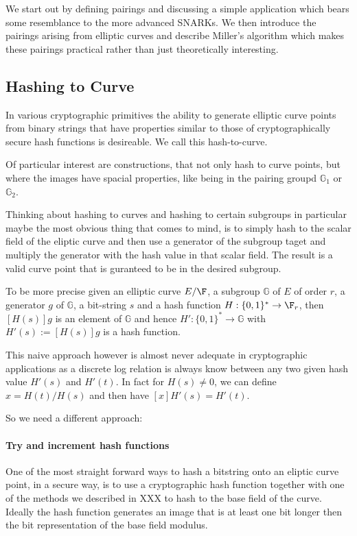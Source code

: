 We start out by defining pairings and discussing a simple application which bears some resemblance to the more advanced SNARKs. We then introduce the pairings arising from elliptic curves and describe Miller's algorithm which makes these pairings practical rather than just theoretically interesting.

\subsection{Hashing to Curve}
In various cryptographic primitives the ability to generate elliptic curve points from binary strings that have properties similar to those of cryptographically secure hash functions is desireable. We call this hash-to-curve.

Of particular interest are constructions, that not only hash to curve points, but where the images have spacial properties, like being in the pairing groupd $\mathbb{G}_1$ or $\mathbb{G}_2$.

Thinking about hashing to curves and hashing to certain subgroups in particular maybe the most obvious thing that comes to mind, is to simply hash to the scalar field of the eliptic curve and then use a generator of the subgroup taget and multiply the generator with the hash value in that scalar field. The result is a valid curve point that is guranteed to be in the desired subgroup. 

To be more precise given an elliptic curve $E/\F$, a subgroup $\mathbb{G}$ of $E$ of order $r$, a generator $g$ of $\mathbb{G}$, a bit-string $s$ and a hash function $H: \{0,1\}^* \to \F_{r}$, then $[H(s)]g$ is an element of $\mathbb{G}$ and hence $H':  \{0,1\}^* \to \mathbb{G}$ with $H'(s):= [H(s)]g$ is a hash function. 

This naive approach however is almost never adequate in cryptographic applications as a discrete log relation is always know between any two given hash value $H'(s)$ and $H'(t)$. In fact for $H(s)\neq 0$, we can define $x= H(t)/H(s)$ and then have $[x]H'(s)=H'(t)$.

So we need a different approach:
\paragraph{Try and increment hash functions}
One of the most straight forward ways to hash a bitstring onto an eliptic curve point, in a  secure way, is to use a cryptographic hash function together with one of the methods we described in XXX to hash to the base field of the curve. Ideally the hash function generates an image that is at least one bit longer then the bit representation of the base field modulus.

